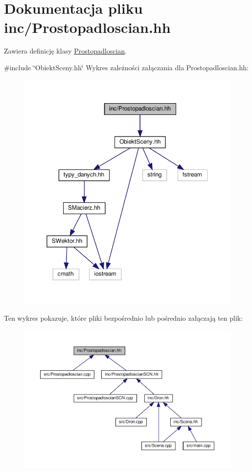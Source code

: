 \hypertarget{Prostopadloscian_8hh}{}\section{Dokumentacja pliku inc/\+Prostopadloscian.hh}
\label{Prostopadloscian_8hh}


Zawiera definicję klasy \hyperlink{classProstopadloscian}{Prostopadloscian}.  


{\ttfamily \#include \char`\"{}Obiekt\+Sceny.\+hh\char`\"{}}\newline
Wykres zależności załączania dla Prostopadloscian.\+hh\+:\nopagebreak
\begin{figure}[H]
\begin{center}
\leavevmode
\includegraphics[width=350pt]{Prostopadloscian_8hh__incl}
\end{center}
\end{figure}
Ten wykres pokazuje, które pliki bezpośrednio lub pośrednio załączają ten plik\+:\nopagebreak
\begin{figure}[H]
\begin{center}
\leavevmode
\includegraphics[width=350pt]{Prostopadloscian_8hh__dep__incl}
\end{center}
\end{figure}
